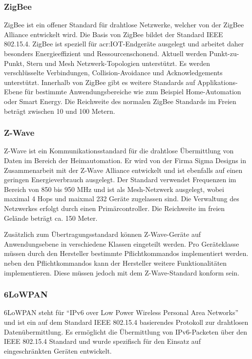 \subsubsection{ZigBee}
ZigBee ist ein offener Standard für drahtlose Netzwerke, welcher von der ZigBee Alliance entwickelt wird. Die Basis von ZigBee bildet der Standard IEEE 802.15.4. ZigBee ist speziell für \gls{acr:IOT}-Endgeräte ausgelegt und arbeitet daher besonders Energieeffizient und Ressourcenschonend. Aktuell werden Punkt-zu-Punkt, Stern und Mesh Netzwerk-Topologien unterstützt. Es werden verschlüsselte Verbindungen, Collision-Avoidance und Acknowledgements unterstützt. Innerhalb von ZigBee gibt es weitere Standards auf Applikations-Ebene für bestimmte Anwendungsbereiche wie zum Beispiel Home-Automation oder Smart Energy. Die Reichweite des normalen ZigBee Standards im Freien beträgt zwischen 10 und 100 Metern.


\subsubsection{Z-Wave}
Z-Wave ist ein Kommunikationsstandard für die drahtlose Übermittlung von Daten im Bereich der Heimautomation. Er wird von der Firma Sigma Designs in Zusammenarbeit mit der Z-Wave Alliance entwickelt und ist ebenfalls auf einen geringen Energieverbrauch ausgelegt. Der Standard verwendet Frequenzen im Bereich von 850 bis 950 MHz und ist als Mesh-Netzwerk ausgelegt, wobei maximal 4 Hops und maixmal 232 Geräte zugelassen sind. Die Verwaltung des Netzwerkes erfolgt durch einen Primärcontroller. Die Reichweite im freien Gelände beträgt ca. 150 Meter. 

Zusätzlich zum Übertragungsstandard können Z-Wave-Geräte auf Anwendungsebene in verschiedene Klassen eingeteilt werden. Pro Geräteklasse müssen durch den Hersteller bestimmte Pflichtkommandos implementiert werden. neben den Pflichtkommandos kann der Hersteller weitere Funktionalitäten implementieren. Diese müssen jedoch mit dem Z-Wave-Standard konform sein.

\subsubsection{6LoWPAN}
6LoWPAN steht für "`IPv6 over Low Power Wireless Personal Area Networks"' und ist ein auf dem Standard IEEE 802.15.4 basierendes Protokoll zur drahtlosen Datenübermittlung. Es ermöglicht die Übermittlung von IPv6-Packeten über den IEEE 802.15.4 Standard und wurde spezifisch für den Einsatz auf eingeschränkten Geräten entwickelt. 

